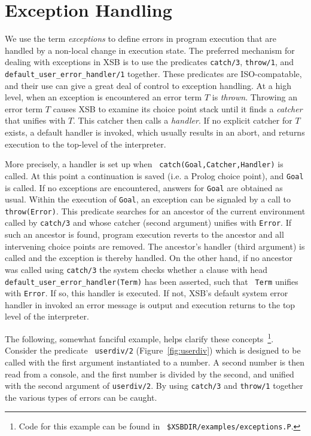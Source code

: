 \chapter{Exception Handling}\label{chap:exception}

We use the term {\em exceptions} to define errors in program execution
that are handled by a non-local change in execution state.  The
preferred mechanism for dealing with exceptions in XSB is to use the
predicates {\tt catch/3}, {\tt throw/1}, and {\tt
default\_user\_error\_handler/1} together.  These predicates are
ISO-compatable, and their use can give a great deal of control to
exception handling.  At a high level, when an exception is encountered
an error term $T$ is {\em thrown}.  Throwing an error term $T$ causes
XSB to examine its choice point stack until it finds a {\em catcher}
that unifies with $T$.  This catcher then calls a {\em handler}.  If
no explicit catcher for $T$ exists, a default handler is invoked,
which usually results in an abort, and returns execution to the
top-level of the interpreter.

More precisely, a handler is set up when {\tt
catch(Goal,Catcher,Handler)} is called.  At this point a continuation
is saved (i.e. a Prolog choice point), and {\tt Goal} is called.  If
no exceptions are encountered, answers for {\tt Goal} are obtained as
usual.  Within the execution of {\tt Goal}, an exception can be
signaled by a call to {\tt throw(Error)}.  This predicate searches
for an ancestor of the current environment called by {\tt catch/3} and
whose catcher (second argument) unifies with {\tt Error}.  If such an
ancestor is found, program execution reverts to the ancestor and all
intervening choice points are removed.  The ancestor's handler (third
argument) is called and the exception is thereby handled.  On the
other hand, if no ancestor was called using {\tt catch/3} the system
checks whether a clause with head {\tt
default\_user\_error\_handler(Term)} has been asserted, such that {\tt
Term} unifies with {\tt Error}.  If so, this handler is executed.  If
not, XSB's default system error handler in invoked an error message is
output and execution returns to the top level of the interpreter.

The following, somewhat fanciful example, helps clarify these
concepts~\footnote{Code for this example can be found in {\tt
\$XSBDIR/examples/exceptions.P}.}.  Consider the predicate {\tt
userdiv/2} (Figure~\ref{fig:userdiv}) which is designed to be called
with the first argument instantiated to a number.  A second number is
then read from a console, and the first number is divided by the
second, and unified with the second argument of {\tt userdiv/2}.  By
using {\tt catch/3} and {\tt throw/1} together the various types of
errors can be caught.

